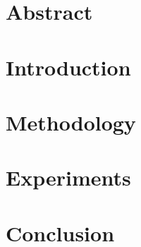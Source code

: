 \documentclass[12pt]{article} %
\begin{document}
\section{Abstract}




\section{Introduction} %




\section{Methodology} %




\section{Experiments} %


\section{Conclusion} %



\end{document}
